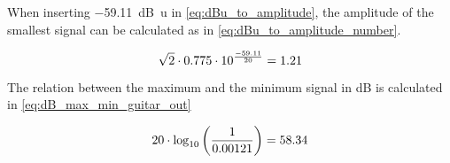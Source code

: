 When inserting \SI{-59.11}{\deci \bel u} in \autoref{eq:dBu_to_amplitude}, the amplitude of the smallest signal can be calculated as in \autoref{eq:dBu_to_amplitude_number}.

\begin{equation}\label{eq:dBu_to_amplitude_number}
       \sqrt{2} \cdot 0.775 \cdot 10^{\frac{-59.11}{20}} = 1.21 \addunit{$\SI{}{\milli \volt}_{peak}$}
    \end{equation}

The relation between the maximum and the minimum signal in dB is calculated in \autoref{eq:dB_max_min_guitar_out}

\begin{equation}\label{eq:dB_max_min_guitar_out}
       20 \cdot \log_{10}\left(\frac{1}{0.00121}\right) = 58.34 \addunit{$\SI{}{\deci \bel}$}
    \end{equation}




